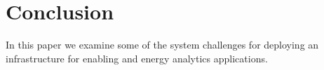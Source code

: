 \section{Conclusion}
In this paper we examine some of the system challenges for deploying an infrastructure for enabling and energy analytics applications.
